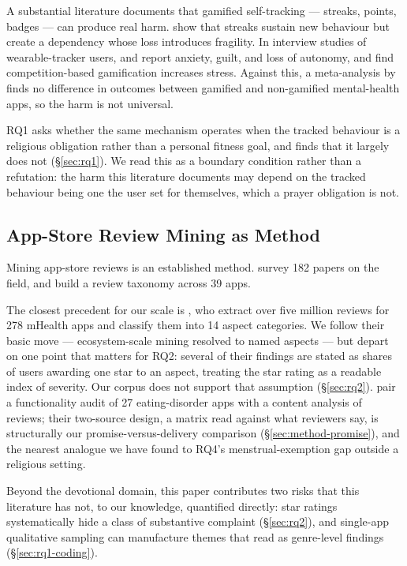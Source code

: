 A substantial literature documents that gamified self-tracking --- streaks,
points, badges --- can produce real harm. \citet{renfree2016dontkick} show that
streaks sustain new behaviour but create a dependency whose loss introduces
fragility. In interview studies of wearable-tracker users,
\citet{humphreys2026toxic} and \citet{demetrovics2025lifestylepressures}
report anxiety, guilt, and loss of autonomy, and \citet{bai2024darkside} find
competition-based gamification increases stress. Against this, a meta-analysis
by \citet{six2021gamification} finds no difference in outcomes between
gamified and non-gamified mental-health apps, so the harm is not universal.

RQ1 asks whether the same mechanism operates when the tracked behaviour is a
religious obligation rather than a personal fitness goal, and finds that it
largely does not (\S\ref{sec:rq1}). We read this as a boundary condition rather
than a refutation: the harm this literature documents may depend on the
tracked behaviour being one the user set for themselves, which a prayer
obligation is not.

\subsection{App-Store Review Mining as Method}

Mining app-store reviews is an established method.
\citet{dabrowski2022analysing} survey 182 papers on the field, and
\citet{ciurumelea2017analyzing} build a review taxonomy across 39 apps.

The closest precedent for our scale is \citet{haggag2022mhealth}, who extract
over five million reviews for 278 mHealth apps and classify them into 14
aspect categories. We follow their basic move --- ecosystem-scale mining
resolved to named aspects --- but depart on one point that matters for RQ2:
several of their findings are stated as shares of users awarding one star to an
aspect, treating the star rating as a readable index of severity. Our corpus
does not support that assumption (\S\ref{sec:rq2}).
\citet{guluzade2024eating} pair a functionality audit of 27 eating-disorder
apps with a content analysis of reviews; their two-source design, a matrix read
against what reviewers say, is structurally our promise-versus-delivery
comparison (\S\ref{sec:method-promise}), and the nearest analogue we have found
to RQ4's menstrual-exemption gap outside a religious setting.

Beyond the devotional domain, this paper contributes two risks that this
literature has not, to our knowledge, quantified directly: star ratings
systematically hide a class of substantive complaint (\S\ref{sec:rq2}), and
single-app qualitative sampling can manufacture themes that read as
genre-level findings (\S\ref{sec:rq1-coding}).

